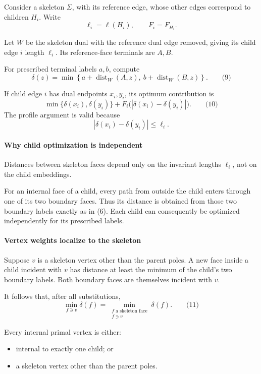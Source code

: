 \documentclass[
  11pt,
  a4paper,
]{article}
\providecommand{\tightlist}{%
  \setlength{\itemsep}{0pt}\setlength{\parskip}{0pt}}
\begin{document}
Consider a skeleton \(\Sigma\), with its reference edge, whose other
edges correspond to children \(H_i\). Write \[
\ell_i=\ell(H_i),\qquad F_i=F_{H_i}.
\]

Let \(W\) be the skeleton dual with the reference dual edge removed,
giving its child edge \(i\) length \(\ell_i\). Its reference-face
terminals are \(A,B\).

For prescribed terminal labels \(a,b\), compute \[
\delta(z)=
\min\left\{
a+\operatorname{dist}_W(A,z),\
b+\operatorname{dist}_W(B,z)
\right\}.
\qquad\text{(9)}
\]

If child edge \(i\) has dual endpoints \(x_i,y_i\), its optimum
contribution is \[
\min\{\delta(x_i),\delta(y_i)\}
+
F_i\bigl(|\delta(x_i)-\delta(y_i)|\bigr).
\qquad\text{(10)}
\] The profile argument is valid because \[
|\delta(x_i)-\delta(y_i)|\le \ell_i.
\]

\paragraph{Why child optimization is
independent}\label{why-child-optimization-is-independent}

Distances between skeleton faces depend only on the invariant lengths
\(\ell_i\), not on the child embeddings.

For an internal face of a child, every path from outside the child
enters through one of its two boundary faces. Thus its distance is
obtained from those two boundary labels exactly as in (6). Each child
can consequently be optimized independently for its prescribed labels.

\paragraph{Vertex weights localize to the
skeleton}\label{vertex-weights-localize-to-the-skeleton}

Suppose \(v\) is a skeleton vertex other than the parent poles. A new
face inside a child incident with \(v\) has distance at least the
minimum of the child's two boundary labels. Both boundary faces are
themselves incident with \(v\).

It follows that, after all substitutions, \[
\min_{f\ni v}\delta(f)
=
\min_{\substack{f\text{ a skeleton face}\\f\ni v}}\delta(f).
\qquad\text{(11)}
\]

Every internal primal vertex is either:

\begin{itemize}
\tightlist
\item
  internal to exactly one child; or
\item
  a skeleton vertex other than the parent poles.
\end{itemize}
\end{document}
